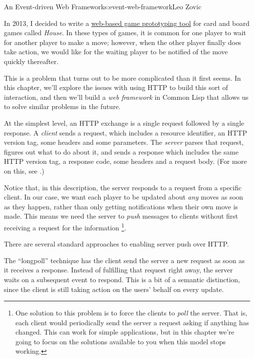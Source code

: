 \begin{aosachapter}{An Event-driven Web Framework}{s:event-web-framework}{Leo Zovic}

In 2013, I decided to write a
\href{https://github.com/Inaimathi/deal}{web-based game prototyping
tool} for card and board games called \emph{House}. In these types of
games, it is common for one player to wait for another player to make a
move; however, when the other player finally does take action, we would
like for the waiting player to be notified of the move quickly
thereafter.

This is a problem that turns out to be more complicated than it first
seems. In this chapter, we'll explore the issues with using HTTP to
build this sort of interaction, and then we'll build a \emph{web
framework} in Common Lisp that allows us to solve similar problems in
the future.

\label{the-basics-of-http-servers}

At the simplest level, an HTTP exchange is a single request followed by
a single response. A \emph{client} sends a request, which includes a
resource identifier, an HTTP version tag, some headers and some
parameters. The \emph{server} parses that request, figures out what to
do about it, and sends a response which includes the same HTTP version
tag, a response code, some headers and a request body. (For more on
this, see .)

Notice that, in this description, the server responds to a request from
a specific client. In our case, we want each player to be updated about
\emph{any} moves as soon as they happen, rather than only getting
notifications when their own move is made. This means we need the server
to \emph{push} messages to clients without first receiving a request for
the information \footnote{One solution to this problem is to force the
  clients to \emph{poll} the server. That is, each client would
  periodically send the server a request asking if anything has changed.
  This can work for simple applications, but in this chapter we're going
  to focus on the solutions available to you when this model stops
  working.}.

There are several standard approaches to enabling server push over HTTP.

\label{cometlongpoll}

The ``longpoll'' technique has the client send the server a new request
as soon as it receives a response. Instead of fulfilling that request
right away, the server waits on a subsequent event to respond. This is a
bit of a semantic distinction, since the client is still taking action
on the users' behalf on every update.


\end{aosachapter}
